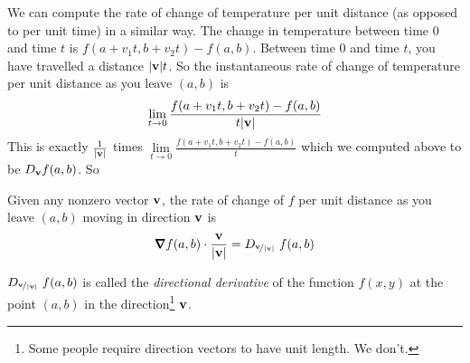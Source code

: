 We can compute the rate of change of temperature per unit distance 
(as opposed to per unit time) in a similar way.  The change in 
temperature between
time $0$ and time $t$ is $f(a+v_1t, b+v_2t)-f(a,b)$. 
Between time $0$ and time $t$, you have travelled a distance $|\mathbf{v}|t$.
So the instantaneous rate of change of temperature per unit distance as you 
leave $(a,b)$ is
\begin{align*}
\lim_{t\rightarrow 0}\frac{f(a+v_1t, b+v_2t)-f(a,b)}{t|\mathbf{v}|}
\end{align*}
This is exactly $\frac{1}{|\mathbf{v}|}$ times 
$\lim\limits_{t\rightarrow 0}\frac{f(a+v_1t, b+v_2t)-f(a,b)}{t}$
which we computed above to be $D_{\mathbf{v}}f(a,b)$. So 
\begin{impeqn}\label{eqn dir deriv space}
Given any nonzero vector $\mathbf{v}$, the rate of change of $f$ per unit
distance as you leave $(a,b)$ moving in direction $\mathbf{v}$ is
\begin{equation*}
\vnabla f(a,b)\cdot\frac{\vv}{|\vv|}
       =D_{\nicefrac{\vv}{|\vv|}}\ f(a,b)
\end{equation*}
\end{impeqn}

\begin{defn}\label{def dri deriv}
$D_{\nicefrac{\mathbf{v}}{|\mathbf{v}|}}\ f(a,b)$ is called the \emph{directional derivative} 
of the function $f(x,y)$ at the point $(a,b)$ in the 
direction\footnote{Some people require direction vectors to have unit
length. We don't. } $\mathbf{v}$.
\end{defn}

